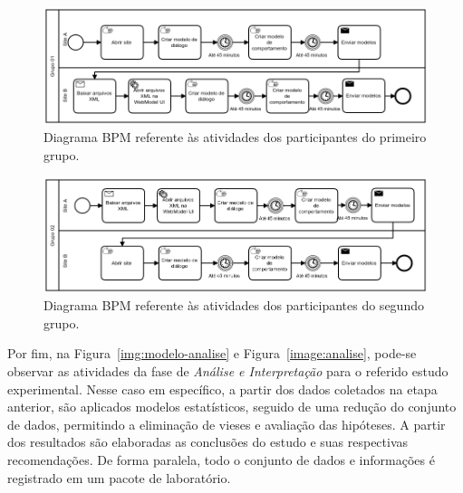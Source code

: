 \begin{landscape}

\begin{figure}[!ht]
\centering
\includegraphics[scale=0.63]{images/grupo01.png}
\caption{Diagrama BPM referente às atividades dos participantes do primeiro grupo.}
\label{g1}
\end{figure}




\begin{figure}[!ht]
\centering
\includegraphics[scale=0.63]{images/grupo02.png}
\caption{Diagrama BPM referente às atividades dos participantes do segundo grupo.}
\label{g2}
\end{figure}


\end{landscape}


Por fim, na Figura~\ref{img:modelo-analise} e Figura~\ref{image:analise}, pode-se observar as atividades da fase de \textit{Análise e Interpretação} para o referido estudo experimental. Nesse caso em específico, a partir dos dados coletados na etapa anterior, são aplicados modelos estatísticos, seguido de uma redução do conjunto de dados, permitindo a eliminação de vieses e avaliação das hipóteses. A partir dos resultados são elaboradas as conclusões do estudo e suas respectivas recomendações. De forma paralela, todo o conjunto de dados e informações é registrado em um pacote de laboratório.

